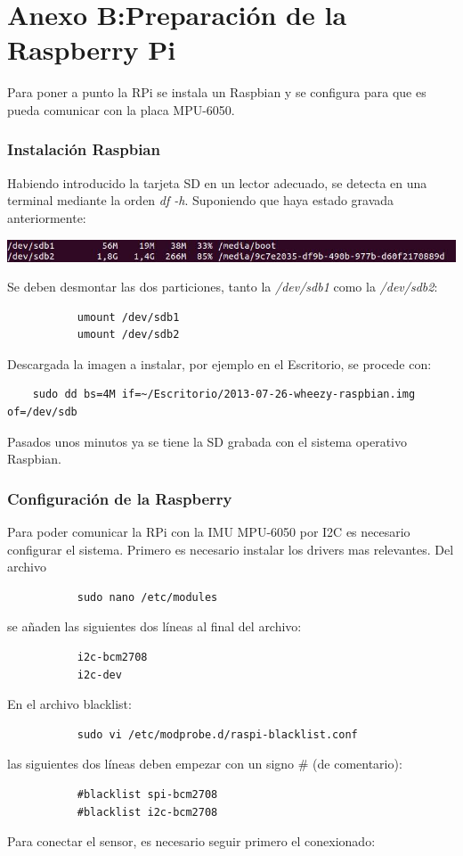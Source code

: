\documentclass[twoside,11pt]{report}
\begin{document}
\section*{Anexo B:Preparación de la Raspberry Pi}
Para poner a punto la RPi se instala un Raspbian y se configura para que es pueda comunicar con la placa MPU-6050.
\subsubsection*{Instalación Raspbian}
Habiendo introducido la tarjeta SD en un lector adecuado, se detecta en una terminal mediante la orden \textit{df -h}. Suponiendo que haya estado gravada anteriormente:
\begin{center}
\includegraphics[scale=0.7]{images/InstalRasp1.jpeg}
\end{center}
Se deben desmontar las dos particiones, tanto la \textit{/dev/sdb1} como la \textit{/dev/sdb2}:
\begin{verbatim}
           umount /dev/sdb1
           umount /dev/sdb2
\end{verbatim}
Descargada la imagen a instalar, por ejemplo en el Escritorio, se procede con:
\begin{verbatim}
    sudo dd bs=4M if=~/Escritorio/2013-07-26-wheezy-raspbian.img of=/dev/sdb
\end{verbatim}
Pasados unos minutos ya se tiene la SD grabada con el sistema operativo Raspbian.
\subsubsection*{Configuración de la Raspberry}
Para poder comunicar la RPi con la IMU MPU-6050 por I2C es necesario configurar el sistema. Primero es necesario instalar los drivers mas relevantes. Del archivo
\begin{verbatim}
           sudo nano /etc/modules
\end{verbatim}
se añaden las siguientes dos líneas al final del archivo:
\begin{verbatim}
           i2c-bcm2708
           i2c-dev
\end{verbatim}
En el archivo blacklist:
\begin{verbatim}
           sudo vi /etc/modprobe.d/raspi-blacklist.conf
\end{verbatim}
las siguientes dos líneas deben empezar con un signo \# (de comentario):
\begin{verbatim}
           #blacklist spi-bcm2708
           #blacklist i2c-bcm2708
\end{verbatim}
Para conectar el sensor, es necesario seguir primero el conexionado:
\end{document}
